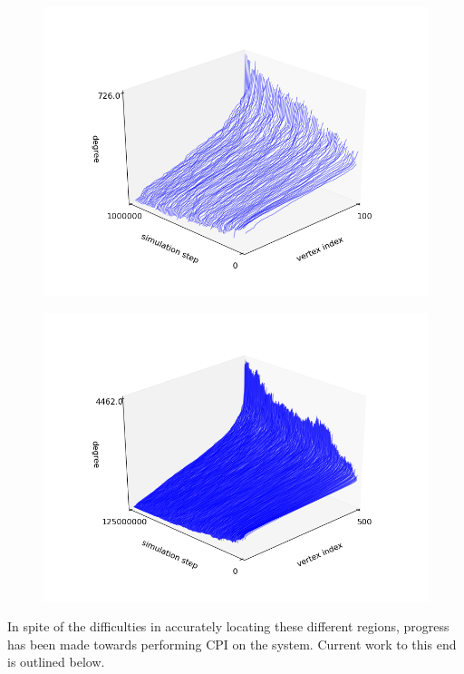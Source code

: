 \documentclass[11pt]{article}
\begin{document}
\begin{figure}[h]
  \begin{minipage}[c][11cm][t]{.9\textwidth}
    \centering
    \includegraphics[width=127mm]{degSurf100}
    \label{fig:degSurf100}\par\vfill
    \includegraphics[width=127mm]{degSurf500}
    \label{fig:degSurf500}
  \end{minipage}
\end{figure}
\vspace{10cm}
In spite of the difficulties in accurately locating these different regions, progress has been made towards performing CPI on the system. Current work to this end is outlined below.
\end{document}
